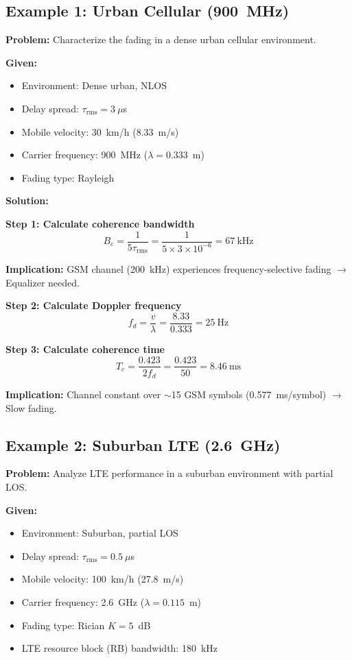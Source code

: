 \subsection{Example 1: Urban Cellular (900~MHz)}

\textbf{Problem:} Characterize the fading in a dense urban cellular environment.

\textbf{Given:}
\begin{itemize}
\item Environment: Dense urban, NLOS
\item Delay spread: $\tau_{\text{rms}} = 3~\mu$s
\item Mobile velocity: 30~km/h (8.33~m/s)
\item Carrier frequency: 900~MHz ($\lambda = 0.333$~m)
\item Fading type: Rayleigh
\end{itemize}

\textbf{Solution:}

\textbf{Step 1: Calculate coherence bandwidth}
\begin{equation*}
B_c = \frac{1}{5\tau_{\text{rms}}} = \frac{1}{5 \times 3 \times 10^{-6}} = 67~\text{kHz}
\end{equation*}

\textbf{Implication:} GSM channel (200~kHz) experiences frequency-selective fading $\rightarrow$ Equalizer needed.

\textbf{Step 2: Calculate Doppler frequency}
\begin{equation*}
f_d = \frac{v}{\lambda} = \frac{8.33}{0.333} = 25~\text{Hz}
\end{equation*}

\textbf{Step 3: Calculate coherence time}
\begin{equation*}
T_c = \frac{0.423}{2f_d} = \frac{0.423}{50} = 8.46~\text{ms}
\end{equation*}

\textbf{Implication:} Channel constant over $\sim$15 GSM symbols (0.577~ms/symbol) $\rightarrow$ Slow fading.

\subsection{Example 2: Suburban LTE (2.6~GHz)}

\textbf{Problem:} Analyze LTE performance in a suburban environment with partial LOS.

\textbf{Given:}
\begin{itemize}
\item Environment: Suburban, partial LOS
\item Delay spread: $\tau_{\text{rms}} = 0.5~\mu$s
\item Mobile velocity: 100~km/h (27.8~m/s)
\item Carrier frequency: 2.6~GHz ($\lambda = 0.115$~m)
\item Fading type: Rician $K=5$~dB
\item LTE resource block (RB) bandwidth: 180~kHz
\end{itemize}

